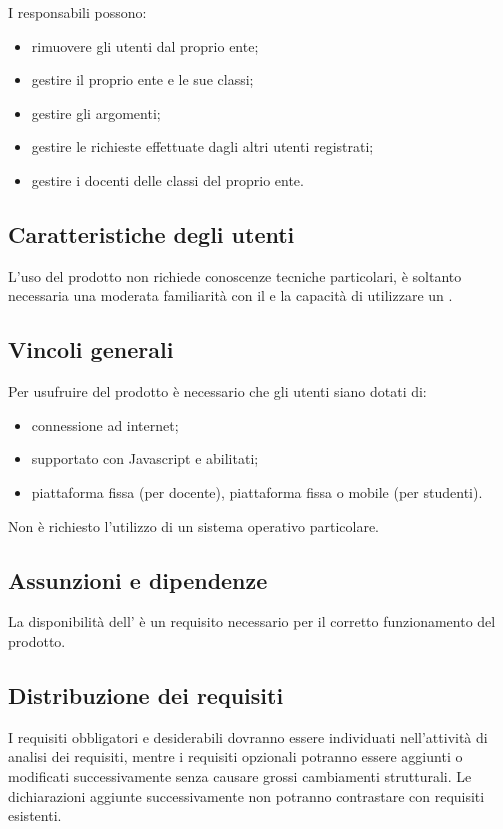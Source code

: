\documentclass[a4paper, titlepage]{article}
\begin{document}
\bigskip

I responsabili possono:
\begin{itemize}
\item rimuovere gli utenti dal proprio ente;
\item gestire il proprio ente e le sue classi;
\item gestire gli argomenti;
\item gestire le richieste effettuate dagli altri utenti registrati;
\item gestire i docenti delle classi del proprio ente.
\end{itemize}

\subsection{Caratteristiche degli utenti}
L'uso del prodotto non richiede conoscenze tecniche particolari, è soltanto necessaria una moderata familiarità con il  e la capacità di utilizzare un .

\subsection{Vincoli generali}
Per usufruire del prodotto è necessario che gli utenti siano dotati di:
\begin{itemize}
\item connessione ad internet;
\item {} supportato con Javascript e  abilitati;
\item piattaforma fissa (per docente), piattaforma fissa o mobile (per studenti).
\end{itemize}

\bigskip

Non è richiesto l'utilizzo di un sistema operativo particolare.

\subsection{Assunzioni e dipendenze}
La disponibilità dell' è un requisito necessario per il corretto funzionamento del prodotto.

\subsection{Distribuzione dei requisiti}
I requisiti obbligatori e desiderabili dovranno essere individuati nell'attività di analisi dei requisiti, mentre i requisiti opzionali potranno essere aggiunti o modificati successivamente senza causare grossi cambiamenti strutturali. Le dichiarazioni aggiunte successivamente non potranno contrastare con requisiti esistenti.
\end{document}
